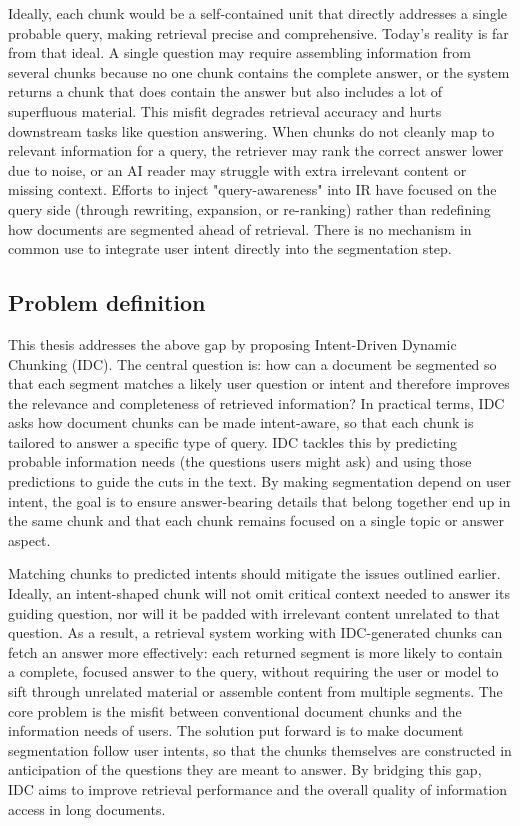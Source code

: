\documentclass[12pt,a4paper]{report}
\begin{document}
Ideally, each chunk would be a self-contained unit that directly addresses a single probable query, making retrieval precise and comprehensive. Today's reality is far from that ideal. A single question may require assembling information from several chunks because no one chunk contains the complete answer, or the system returns a chunk that does contain the answer but also includes a lot of superfluous material. This misfit degrades retrieval accuracy and hurts downstream tasks like question answering. When chunks do not cleanly map to relevant information for a query, the retriever may rank the correct answer lower due to noise, or an AI reader may struggle with extra irrelevant content or missing context. Efforts to inject "query-awareness" into IR have focused on the query side (through rewriting, expansion, or re-ranking) rather than redefining how documents are segmented ahead of retrieval. There is no mechanism in common use to integrate user intent directly into the segmentation step.

\subsection{Problem definition}
This thesis addresses the above gap by proposing Intent-Driven Dynamic Chunking (IDC). The central question is: how can a document be segmented so that each segment matches a likely user question or intent and therefore improves the relevance and completeness of retrieved information? In practical terms, IDC asks how document chunks can be made intent-aware, so that each chunk is tailored to answer a specific type of query. IDC tackles this by predicting probable information needs (the questions users might ask) and using those predictions to guide the cuts in the text. By making segmentation depend on user intent, the goal is to ensure answer-bearing details that belong together end up in the same chunk and that each chunk remains focused on a single topic or answer aspect.

Matching chunks to predicted intents should mitigate the issues outlined earlier. Ideally, an intent-shaped chunk will not omit critical context needed to answer its guiding question, nor will it be padded with irrelevant content unrelated to that question. As a result, a retrieval system working with IDC-generated chunks can fetch an answer more effectively: each returned segment is more likely to contain a complete, focused answer to the query, without requiring the user or model to sift through unrelated material or assemble content from multiple segments. The core problem is the misfit between conventional document chunks and the information needs of users. The solution put forward is to make document segmentation follow user intents, so that the chunks themselves are constructed in anticipation of the questions they are meant to answer. By bridging this gap, IDC aims to improve retrieval performance and the overall quality of information access in long documents.
\end{document}
